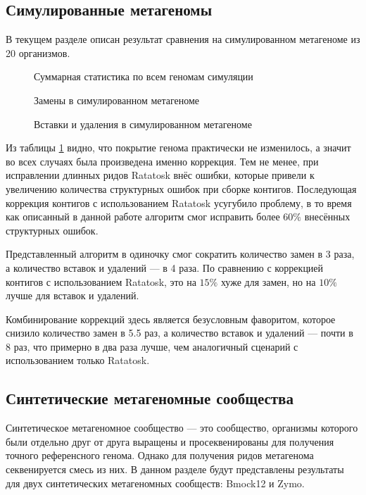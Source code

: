 \documentclass[14pt]{matmex-diploma-custom}
\begin{document}
\subsection{Симулированные метагеномы}
В текущем разделе описан результат сравнения на симулированном метагеноме из 20 организмов.

\begin{figure}[h!]
    
    \caption{Суммарная статистика по всем геномам симуляции}
    \label{fig:general_base20}
\end{figure}

\begin{figure}[h!]
    
    \caption{Замены в симулированном метагеноме}
    \label{fig:mismatches_base20}
\end{figure}

\begin{figure}[h!]
    
    \caption{Вставки и удаления в симулированном метагеноме}
    \label{fig:indels_base20}
\end{figure}

Из таблицы \ref{fig:general_base20} видно, что покрытие генома практически не изменилось, а значит во всех случаях была произведена именно коррекция. Тем не менее, при исправлении длинных ридов Ratatosk внёс ошибки, которые привели к увеличению количества структурных ошибок при сборке контигов. Последующая коррекция контигов с использованием Ratatosk усугубило проблему, в то время как описанный в данной работе алгоритм смог исправить более $60\%$ внесённых структурных ошибок.

Представленный алгоритм в одиночку смог сократить количество замен в 3 раза, а количество вставок и удалений --- в 4 раза. По сравнению с коррекцией контигов с использованием Ratatosk, это на $15\%$ хуже для замен, но на $10\%$ лучше для вставок и удалений.

Комбинирование коррекций здесь является безусловным фаворитом, которое снизило количество замен в 5.5 раз, а количество вставок и удалений --- почти в 8 раз, что примерно в два раза лучше, чем аналогичный сценарий с использованием только Ratatosk.

\subsection{Синтетические метагеномные сообщества}
Синтетическое метагеномное сообщество --- это сообщество, организмы которого были отдельно друг от друга выращены и просеквенированы для получения точного референсного генома. Однако для получения ридов метагенома секвенируется смесь из них. В данном разделе будут представлены результаты для двух синтетических метагеномных сообществ: Bmock12 и Zymo.
\end{document}
